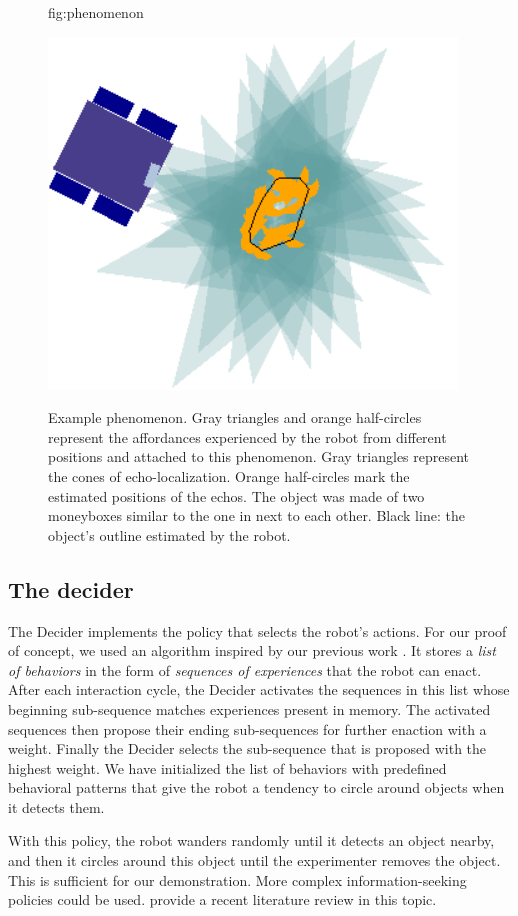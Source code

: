 \documentclass[pmlr]{jmlr}%
\begin{document}
\begin{figure}[htbp]
	\floatconts
	{fig:phenomenon}
	{\caption{Example phenomenon.
	Gray triangles and orange half-circles represent the affordances experienced by the robot from different positions and attached to this phenomenon.
	Gray triangles represent the cones of echo-localization.
	Orange half-circles mark the estimated positions of the echos.
	The object was made of two moneyboxes similar to the one in  next to each other.
	Black line: the object's outline estimated by the robot.}}
	{\includegraphics[width=0.4\linewidth]{images/Figure_5_phenomenon}}
\end{figure}



\subsection{The decider}
\label{sec:decider}

The Decider implements the policy that selects the robot's actions. 
For our proof of concept, we used an algorithm inspired by our previous work \citep{georgeon_eca_2013,robertson_biologically_2009}.
It stores a \textit{list of behaviors} in the form of \textit{sequences of experiences} that the robot can enact. 
After each interaction cycle, the Decider activates the sequences in this list whose beginning sub-sequence matches experiences present in memory. 
The activated sequences then propose their ending sub-sequences for further enaction with a weight. 
Finally the Decider selects the sub-sequence that is proposed with the highest weight. 
We have initialized the list of behaviors with predefined behavioral patterns that give the robot a tendency to circle around objects when it detects them. 

With this policy, the robot wanders randomly until it detects an object nearby, and then it circles around this object until the experimenter removes the object. 
This is sufficient for our demonstration. 
More complex information-seeking policies could be used. 
\cite{gottlieb_towards_2018} provide a recent literature review in this topic. 
\end{document}
